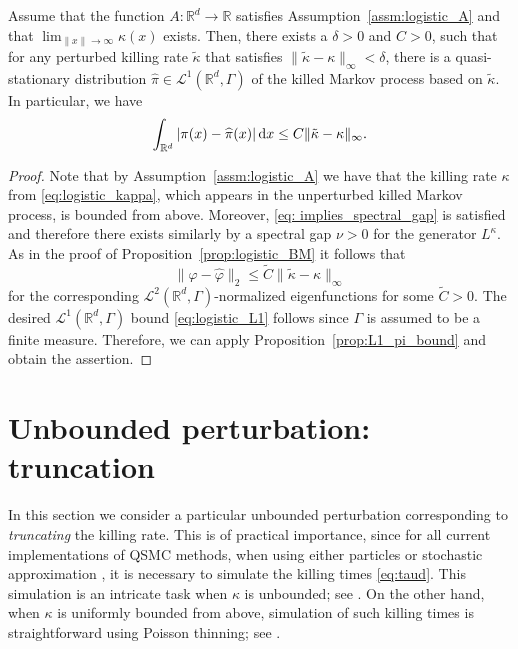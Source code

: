 \documentclass{aptpub}
\newcommand{\Rd}{\mathbb R^d}
\begin{document}
 \begin{proposition}
     Assume that the function $A\colon \mathbb{R}^d \to \mathbb{R}$ satisfies Assumption~\ref{assm:logistic_A} and that $\lim_{\|x\|\to\infty}\kappa(x)$ exists. Then, there exists a $\delta >0$ and $C>0$, such that for any perturbed killing rate $\widetilde{\kappa}$ that satisfies $\|\widetilde \kappa - \kappa\|_\infty <\delta$, there is a quasi-stationary distribution $\widehat \pi \in \mathcal L^1(\Rd,\Gamma)$ of the killed Markov process based on $\widetilde{\kappa}$. In particular, we have
     \begin{equation}
         \int_{\mathbb{R}^d} |\pi(x)-\widehat \pi(x)|\dif x \le C \|\tilde \kappa - \kappa\|_\infty. 
         \label{eq:logistic_L1}
     \end{equation}
     \label{prop:logistic_bd}
 \end{proposition}
 \begin{proof}
    Note that by Assumption~\ref{assm:logistic_A} we have that the killing rate $\kappa$ from \eqref{eq:logistic_kappa}, which appears in the unperturbed killed Markov process, is bounded from above. Moreover, \eqref{eq: implies_spectral_gap} 
    is satisfied and therefore there exists similarly by \cite[Lemma~14.4.1]{Davies2007} a spectral gap $\nu>0$ for the generator $L^\kappa$. As in the proof of Proposition~\ref{prop:logistic_BM} it follows that
    \[
        \|\varphi-\widehat \varphi \|_2 \le 
        \widetilde{C} \|\tilde\kappa-\kappa\|_\infty   
    \]
for the corresponding $\mathcal L^2(\Rd,\Gamma)$-normalized eigenfunctions for some $\widetilde{C}>0$. 
    The desired $\mathcal L^1(\Rd,\Gamma)$ bound \eqref{eq:logistic_L1} follows since $\Gamma$ is assumed to be a finite measure. Therefore, we can apply Proposition~\ref{prop:L1_pi_bound} and obtain the assertion.
 \end{proof}






\section{Unbounded perturbation: truncation}
\label{sec:truncation}
In this section we consider a particular unbounded perturbation corresponding to \textit{truncating} the killing rate. This is of practical importance, since for all current implementations of QSMC methods, when using either particles \cite{Pollock2020, DelMoral2003, Burdzy2000} or stochastic approximation \cite{Kumar2019, Mailler2020,Wang2020approx, Aldous1988}, it is necessary to simulate the killing times \eqref{eq:taud}. This simulation is an intricate task when $\kappa$ is unbounded; see \cite{Pollock2020}. On the other hand, when $\kappa$ is uniformly bounded from above, simulation of such killing times is straightforward using Poisson thinning; see \cite{Lewis1979}. 
\end{document}
